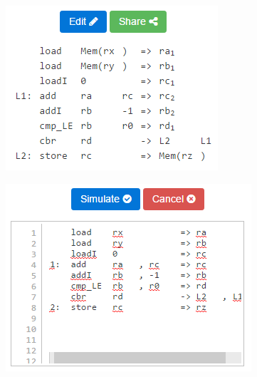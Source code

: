 \documentclass[bsc,twoside,singlespacing,parskip,logo,notimes,normalheadings]{infthesis}
\begin{document}
        \begin{figure}[!ht]
          \hspace{2mm}
          \begin{minipage}{.43\textwidth}
            \includegraphics[width=\textwidth, trim=-15 -35 -15 0]{img/codedisplay.png}
            \captionsetup{width=\textwidth, justification=centering}
            \label{fig:code-display}
          \end{minipage}%
          \quad
          \begin{minipage}{.43\textwidth}
            \includegraphics[width=\textwidth]{img/codeedit.png}
            \captionsetup{width=\textwidth, justification=centering}
            \label{fig:code-edit}
          \end{minipage}
        \end{figure}
\end{document}
